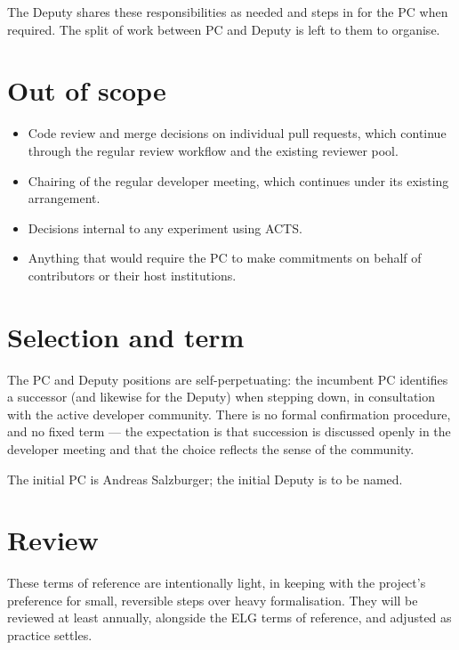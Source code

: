 \documentclass[11pt,a4paper]{article}
\begin{document}
The Deputy shares these responsibilities as needed and steps in for the PC when
required. The split of work between PC and Deputy is left to them to organise.

\section*{Out of scope}

\begin{itemize}
    \item Code review and merge decisions on individual pull requests, which
          continue through the regular review workflow and the existing reviewer
          pool.
    \item Chairing of the regular developer meeting, which continues under its
          existing arrangement.
    \item Decisions internal to any experiment using ACTS.
    \item Anything that would require the PC to make commitments on behalf of
          contributors or their host institutions.
\end{itemize}

\section*{Selection and term}

The PC and Deputy positions are self-perpetuating: the incumbent PC identifies a
successor (and likewise for the Deputy) when stepping down, in consultation with
the active developer community. There is no formal confirmation procedure, and no
fixed term --- the expectation is that succession is discussed openly in the
developer meeting and that the choice reflects the sense of the community.

The initial PC is Andreas Salzburger; the initial Deputy is to be named.

\section*{Review}

These terms of reference are intentionally light, in keeping with the project's
preference for small, reversible steps over heavy formalisation. They will be
reviewed at least annually, alongside the ELG terms of reference, and adjusted as
practice settles.
\end{document}
